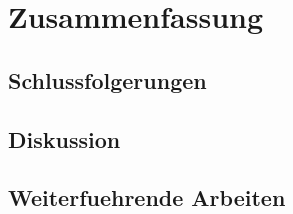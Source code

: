 \section{Zusammenfassung}
\label{sec:zusammenfassung}


\subsection{Schlussfolgerungen}
\label{subsec:z_schlussfolgerungen}

\subsection{Diskussion}
\label{subsec:z_diskussion}

\subsection{Weiterfuehrende Arbeiten}
\label{subsec:z_weiterfuehrende_arbeiten}
